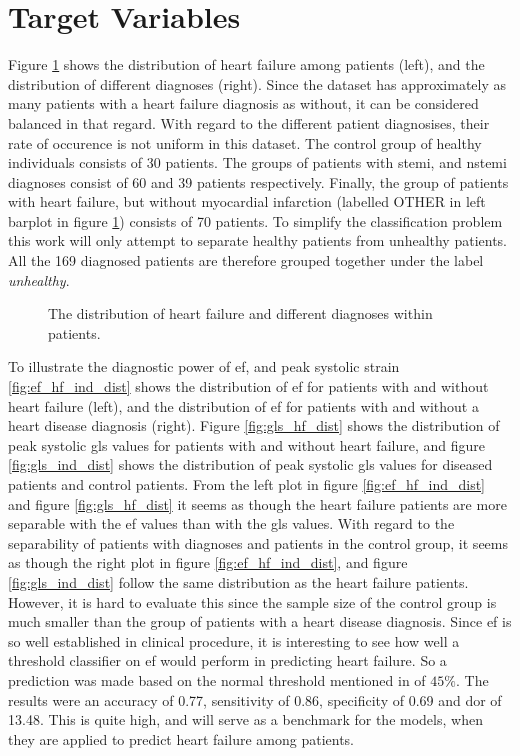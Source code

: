 \section{Target Variables} \label{sec:target}
Figure \ref{fig:hf_ind_dist} shows the distribution of heart failure among patients (left), and the distribution of different diagnoses (right). Since the dataset has approximately as many patients with a heart failure diagnosis as without, it can be considered balanced in that regard. With regard to the different patient diagnosises, their rate of occurence is not uniform in this dataset. The control group of healthy individuals consists of 30 patients. The groups of patients with \acrshort{stemi}, and \acrshort{nstemi} diagnoses consist of 60 and 39 patients respectively. Finally, the group of patients with heart failure, but without myocardial infarction (labelled OTHER in left barplot in figure \ref{fig:hf_ind_dist}) consists of 70 patients. To simplify the classification problem this work will only attempt to separate healthy patients from unhealthy patients. All the 169 diagnosed patients are therefore grouped together under the label \textit{unhealthy}. \bigskip

\begin{figure}[h]
    \centering
    
    \caption{The distribution of heart failure and different diagnoses within patients.}
    \label{fig:hf_ind_dist}
\end{figure}

To illustrate the diagnostic power of \acrshort{ef}, and peak systolic strain \ref{fig:ef_hf_ind_dist} shows the distribution of \acrshort{ef} for patients with and without heart failure (left), and the distribution of \acrshort{ef} for patients with and without a heart disease diagnosis (right). Figure \ref{fig:gls_hf_dist} shows the distribution of peak systolic \acrshort{gls} values for patients with and without heart failure, and figure \ref{fig:gls_ind_dist} shows the distribution of peak systolic \acrshort{gls} values for diseased patients and control patients. From the left plot in figure \ref{fig:ef_hf_ind_dist} and figure \ref{fig:gls_hf_dist} it seems as though the heart failure patients are more separable with the \acrshort{ef} values than with the \acrshort{gls} values. With regard to the separability of patients with diagnoses and patients in the control group, it seems as though the right plot in figure \ref{fig:ef_hf_ind_dist}, and figure \ref{fig:gls_ind_dist} follow the same distribution as the heart failure patients. However, it is hard to evaluate this since the sample size of the control group is much smaller than the group of patients with a heart disease diagnosis. Since \acrshort{ef} is so well established in clinical procedure, it is interesting to see how well a threshold classifier on \acrshort{ef} would perform in predicting heart failure. So a prediction was made based on the normal threshold mentioned in \textcite{myocardial_imaging} of $45\%$. The results were an accuracy of 0.77, sensitivity of 0.86, specificity of 0.69 and \acrshort{dor} of 13.48. This is quite high, and will serve as a benchmark for the models, when they are applied to predict heart failure among patients.  
\bigskip

